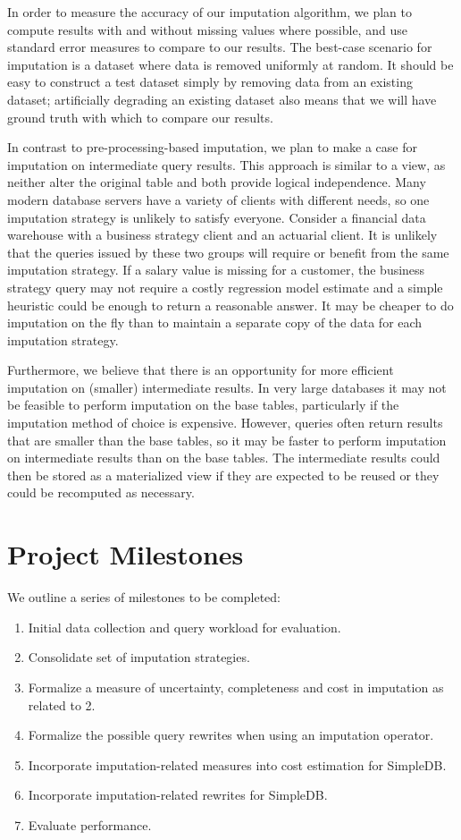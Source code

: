 \documentclass{article}
\begin{document}
In order to measure the accuracy of our imputation algorithm, we plan to compute results with and without missing values where possible, and use standard error measures to compare to our results. The best-case scenario for imputation is a dataset where data is removed uniformly at random. It should be easy to construct a test dataset  simply by removing data from an existing dataset; artificially degrading an existing dataset also means that we will have ground truth with which to compare our results.

In contrast to pre-processing-based imputation, we plan to make a case for imputation on intermediate query results. This approach is similar to a view, as neither alter the original table and both provide logical independence. Many modern database servers have a variety of clients with different needs, so one imputation strategy is unlikely to satisfy everyone. Consider a financial data warehouse with a business strategy client and an actuarial client. It is unlikely that the queries issued by these two groups will require or benefit from the same imputation strategy. If a salary value is missing for a customer, the business strategy query may not require a costly regression model estimate and a simple heuristic could be enough to return a reasonable answer. It may be cheaper to do imputation on the fly than to maintain a separate copy of the data for each imputation strategy.

Furthermore, we believe that there is an opportunity for more efficient imputation on (smaller) intermediate results. In very large databases it may not be feasible to perform imputation on the base tables, particularly if the imputation method of choice is expensive. However, queries often return results that are smaller than the base tables, so it may be faster to perform imputation on intermediate results than on the base tables. The intermediate results could then be stored as a materialized view if they are expected to be reused or they could be recomputed as necessary.

\section{Project Milestones}

We outline a series of milestones to be completed:
\begin{enumerate}
\item Initial data collection and query workload for evaluation.
\item Consolidate set of imputation strategies.
\item Formalize a measure of uncertainty, completeness and cost in imputation as related to 2.
\item Formalize the possible query rewrites when using an imputation operator.
\item Incorporate imputation-related measures into cost estimation for SimpleDB.
\item Incorporate imputation-related rewrites for SimpleDB.
\item Evaluate performance.
\end{enumerate}
\end{document}
